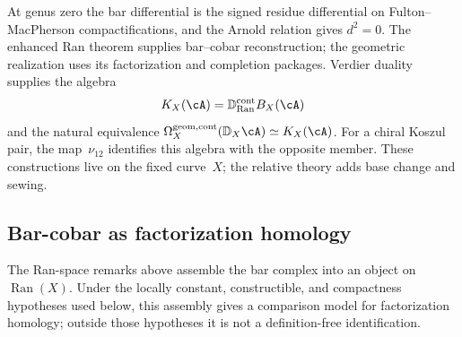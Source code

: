 At genus zero the bar differential is the signed residue differential
on Fulton--MacPherson compactifications, and the Arnold relation gives
$d^2=0$.  The enhanced Ran theorem supplies bar--cobar reconstruction;
the geometric realization uses its factorization and completion
packages.  Verdier duality supplies the algebra
\[
K_X(\cA)=\mathbb D_{\operatorname{Ran}}^{\mathrm{cont}}B_X(\cA)
\]
and the natural equivalence
$\Omega_X^{\mathrm{geom,cont}}(\mathbb D_X\cA)\simeq K_X(\cA)$.
For a chiral Koszul pair, the map~$\nu_{12}$ identifies this algebra
with the opposite member.  These constructions live on the fixed
curve~$X$; the relative theory adds base change and sewing.

\subsection{Bar-cobar as factorization homology}
\label{subsec:bar-cobar-fh}

The Ran-space remarks above assemble the bar complex into an
object on $\operatorname{Ran}(X)$. Under the locally constant,
constructible, and compactness hypotheses used below, this assembly
gives a comparison model for factorization homology; outside those
hypotheses it is not a definition-free identification.

